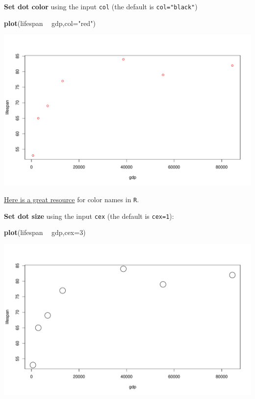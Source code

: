 \documentclass[
]{book}
\newenvironment{Shaded}{\begin{snugshade}}{\end{snugshade}}
\newcommand{\DataTypeTok}[1]{\textcolor[rgb]{0.13,0.29,0.53}{#1}}
\newcommand{\DecValTok}[1]{\textcolor[rgb]{0.00,0.00,0.81}{#1}}
\newcommand{\KeywordTok}[1]{\textcolor[rgb]{0.13,0.29,0.53}{\textbf{#1}}}
\newcommand{\NormalTok}[1]{#1}
\newcommand{\OperatorTok}[1]{\textcolor[rgb]{0.81,0.36,0.00}{\textbf{#1}}}
\newcommand{\StringTok}[1]{\textcolor[rgb]{0.31,0.60,0.02}{#1}}
\begin{document}
\textbf{Set dot color} using the input \texttt{col} (the default is \texttt{col="black"})

\begin{Shaded}
\begin{Highlighting}[]
\KeywordTok{plot}\NormalTok{(lifespan }\OperatorTok{~}\StringTok{ }\NormalTok{gdp,}\DataTypeTok{col=}\StringTok{"red"}\NormalTok{)}
\end{Highlighting}
\end{Shaded}

\includegraphics{figures/unnamed-chunk-90-1.pdf}

\href{http://www.stat.columbia.edu/~tzheng/files/Rcolor.pdf?utm_source=twitterfeed\&utm_medium=twitter}{Here is a great resource} for color names in \texttt{R}.

\textbf{Set dot size} using the input \texttt{cex} (the default is \texttt{cex=1}):

\begin{Shaded}
\begin{Highlighting}[]
\KeywordTok{plot}\NormalTok{(lifespan }\OperatorTok{~}\StringTok{ }\NormalTok{gdp,}\DataTypeTok{cex=}\DecValTok{3}\NormalTok{)}
\end{Highlighting}
\end{Shaded}

\includegraphics{figures/unnamed-chunk-91-1.pdf}
\end{document}
